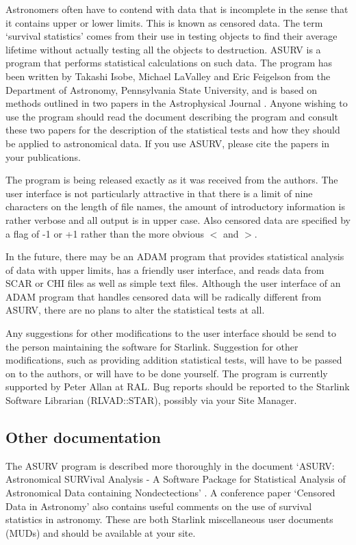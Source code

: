 Astronomers often have to contend with data that is incomplete in the sense
that it contains upper or lower limits. This is known as censored data. The
term `survival statistics' comes from their use in testing objects to find
their average lifetime without actually testing all the objects to destruction.
ASURV is a program that performs statistical calculations on such data. The
program has been written by Takashi Isobe, Michael LaValley and Eric Feigelson
from the Department of Astronomy, Pennsylvania State University, and is based
on methods outlined in two papers in the Astrophysical Journal
\cite{isobe-1,isobe-2}. Anyone wishing to use the program should read the
document describing the program and consult these two papers for the
description of the statistical tests and how they should be applied to
astronomical data. If you use ASURV, please cite the papers
\cite{isobe-1,isobe-2} in your publications.

The program is being released exactly as it was received from the authors. The
user interface is not particularly attractive in that there is a limit of nine
characters on the length of file names, the amount of introductory information
is rather verbose and all output is in upper case. Also censored data are
specified by a flag of -1 or +1 rather than the more obvious $<$ and $>$.

In the future, there may be an ADAM program that provides statistical analysis
of data with upper limits, has a friendly user interface, and reads data from
SCAR or CHI files as well as simple text files. Although the user interface of
an ADAM program that handles censored data will be radically different from
ASURV, there are no plans to alter the statistical tests at all.

Any suggestions for other modifications to the user interface should be send to
the person maintaining the software for Starlink. Suggestion for other
modifications, such as providing addition statistical tests, will have to be
passed on to the authors, or will have to be done yourself. The program is
currently supported by Peter Allan at RAL. Bug reports should be reported to
the Starlink Software Librarian (RLVAD::STAR), possibly via your Site Manager.

\subsection{Other documentation}

The ASURV program is described more thoroughly in the document `ASURV:
Astronomical SURVival Analysis - A Software Package for Statistical Analysis of
Astronomical Data containing Nondectections' \cite{mud-1}. A conference paper
`Censored Data in Astronomy' \cite{mud-2} also contains useful comments on the
use of survival statistics in astronomy. These are both Starlink miscellaneous
user documents (MUDs) and should be available at your site.

